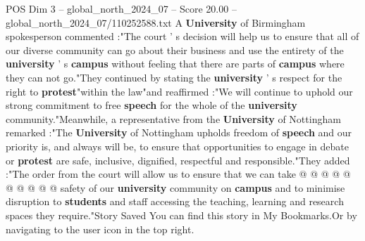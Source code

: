 \begin{textsample}{POS Dim 3 – global\_north\_2024\_07 – Score 20.00 – global\_north\_2024\_07/110252588.txt}
A \textbf{University} of Birmingham spokesperson commented :"The court ' s decision will help us to ensure that all of our diverse community can go about their business and use the entirety of the \textbf{university} ' s \textbf{campus} without feeling that there are parts of \textbf{campus} where they can not go."They continued by stating the \textbf{university} ' s respect for the right to \textbf{protest}"within the law"and reaffirmed :"We will continue to uphold our strong commitment to free \textbf{speech} for the whole of the \textbf{university} community."Meanwhile, a representative from the \textbf{University} of Nottingham remarked :"The \textbf{University} of Nottingham upholds freedom of \textbf{speech} and our priority is, and always will be, to ensure that opportunities to engage in debate or \textbf{protest} are safe, inclusive, dignified, respectful and responsible."They added :"The order from the court will allow us to ensure that we can take @ @ @ @ @ @ @ @ @ @ safety of our \textbf{university} community on \textbf{campus} and to minimise disruption to \textbf{students} and staff accessing the teaching, learning and research spaces they require."Story Saved You can find this story in My Bookmarks.Or by navigating to the user icon in the top right.

\end{textsample}
